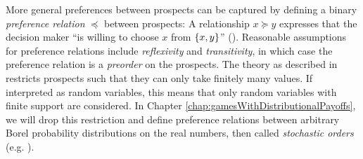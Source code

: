 \documentclass[a4paper,DIV=11,abstracton,twoside=semi]{scrreprt}
\theoremstyle{definition}
\begin{document}
    More general preferences between prospects can be captured by defining a binary \emph{preference relation} $\preccurlyeq$ between prospects:
    A relationship $x \succcurlyeq y$ expresses that the decision maker “is willing to choose $x$ from $\{x, y\}$” (\cite[p. 14]{bib:wakkerProspectTheory}).
    Reasonable assumptions for preference relations include \emph{reflexivity} and \emph{transitivity}, in which case the preference relation is a \emph{preorder} on the prospects.
    The theory as described in \cite{bib:wakkerProspectTheory} restricts prospects such that they can only take finitely many values. If interpreted as random variables, this means that only random variables with finite support are considered. In Chapter \ref{chap:gamesWithDistributionalPayoffs}, we will drop this restriction and define preference relations between arbitrary Borel probability distributions on the real numbers, then called \emph{stochastic orders} (e.g. \cite{bib:shakedStochasticOrders}).
    
\end{document}
